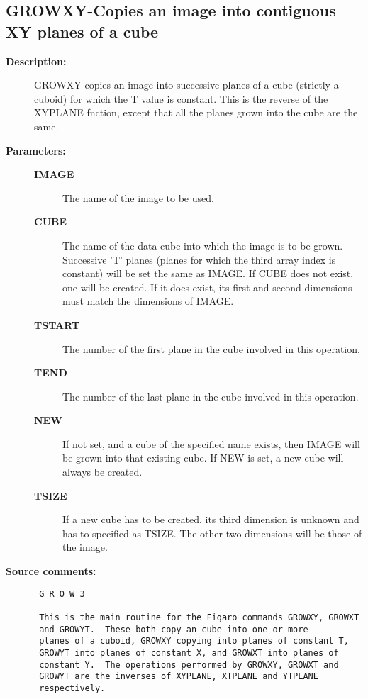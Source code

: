 \subsection{GROWXY-\label{GROWXY}Copies an image into contiguous XY planes of a cube}
\begin{description}

\item [{\bf Description:}]
 GROWXY copies an image into successive planes of a cube (strictly
 a cuboid) for which the T value is constant.  This is the reverse
 of the XYPLANE fnction, except that all the planes grown into the
 cube are the same.

\item [{\bf Parameters:}]
\begin{description}
\item [{\bf IMAGE}]
 The name of the image to be used.
\item [{\bf CUBE}]
 The name of the data cube into which the image
 is to be grown.  Successive 'T' planes (planes for which
 the third array index is constant) will be set the same
 as IMAGE.  If CUBE does not exist, one will be created.
 If it does exist, its first and second dimensions must
 match the dimensions of IMAGE.
\item [{\bf TSTART}]
 The number of the first plane in the cube
 involved in this operation.
\item [{\bf TEND}]
 The number of the last plane in the cube
 involved in this operation.
\item [{\bf NEW}]
 If not set, and a cube of the specified name exists,
 then IMAGE will be grown into that existing cube.
 If NEW is set, a new cube will always be created.
\item [{\bf TSIZE}]
 If a new cube has to be created, its third dimension
 is unknown and has to specified as TSIZE.  The other
 two dimensions will be those of the image.
\end{description}

\item [{\bf Source comments:}]
\begin{verbatim}
 G R O W 3

 This is the main routine for the Figaro commands GROWXY, GROWXT
 and GROWYT.  These both copy an cube into one or more
 planes of a cuboid, GROWXY copying into planes of constant T,
 GROWYT into planes of constant X, and GROWXT into planes of
 constant Y.  The operations performed by GROWXY, GROWXT and
 GROWYT are the inverses of XYPLANE, XTPLANE and YTPLANE
 respectively.


\end{verbatim}
\end{description}
